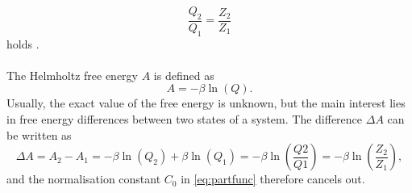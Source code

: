 \begin{equation}
\frac{Q_2}{Q_1} = \frac{Z_2}{Z_1}
\end{equation}
holds \autocite[17]{freeEnergyBook}.\\
\\
The Helmholtz free energy $A$ is defined as
\begin{equation}
	A = - \beta \ln\left(Q\right).
\end{equation}
Usually, the exact value of the free energy is unknown, but the main interest lies in free energy differences between two states of a system. The difference $\Delta A$ can be written as
\begin{equation}
\Delta A = A_2 - A_1 = - \beta \ln\left(Q_2\right) + \beta \ln\left(Q_1\right) = -\beta \ln\left(\frac{Q2}{Q1}\right) = -\beta \ln \left(\frac{Z_2}{Z_1}\right),
\end{equation}
and the normalisation constant $C_0$ in \autoref{eq:partfunc} therefore cancels out.

